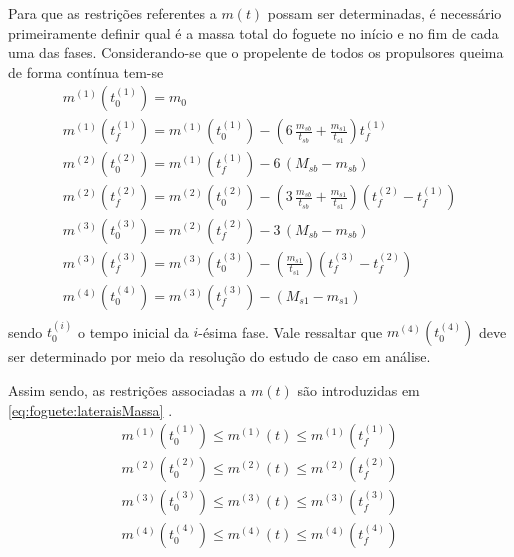 Para que as restrições referentes a $ m(t) $ possam ser determinadas, é necessário primeiramente definir qual é a massa total do foguete no início e no fim de cada uma das fases. Considerando-se que o propelente de todos os propulsores queima de forma contínua tem-se
%
\begin{equation}
\begin{gathered}
m^{(1)} \left( t_0^{(1)} \right) = m_0 \\
m^{(1)} \left( t_f^{(1)} \right) = m^{(1)} \left( t_0^{(1)} \right) - \left( 6 \, \frac{m_{sb}}{t_{sb}} + \frac{m_{s1}}{t_{s1}} \right) t_f^{(1)} \\
m^{(2)} \left( t_0^{(2)} \right) = m^{(1)} \left( t_f^{(1)} \right) - 6 \, (M_{sb} - m_{sb}) \\
m^{(2)} \left( t_f^{(2)} \right) = m^{(2)} \left( t_0^{(2)} \right) - \left( 3 \, \frac{m_{sb}}{t_{sb}} + \frac{m_{s1}}{t_{s1}} \right) \left( t_f^{(2)} - t_f^{(1)} \right) \\
m^{(3)} \left( t_0^{(3)} \right) = m^{(2)} \left( t_f^{(2)} \right) - 3 \, (M_{sb} - m_{sb}) \\
m^{(3)} \left( t_f^{(3)} \right) = m^{(3)} \left( t_0^{(3)} \right) - \left( \frac{m_{s1}}{t_{s1}} \right) \left( t_f^{(3)} - t_f^{(2)} \right) \\
m^{(4)} \left( t_0^{(4)} \right) = m^{(3)} \left( t_f^{(3)} \right) - ( M_{s1} - m_{s1} ) \\
\end{gathered}
\end{equation}
%
sendo $ t_0^{(i)} $ o tempo inicial da $ i $-ésima fase. Vale ressaltar que $ m^{(4)} \left( t_0^{(4)} \right) $ deve ser determinado por meio da resolução do estudo de caso em análise. 

Assim sendo, as restrições associadas a $ m(t) $ são introduzidas em \eqref{eq:foguete:lateraisMassa} \cite{becerra_psopt_2019}.
%
\begin{equation}
	\label{eq:foguete:lateraisMassa}
	\begin{gathered}
		m^{(1)} \left( t_0^{(1)} \right) \leq m^{(1)}(t) \leq m^{(1)} \left( t_f^{(1)} \right) \\
		m^{(2)} \left( t_0^{(2)} \right) \leq m^{(2)}(t) \leq m^{(2)} \left( t_f^{(2)} \right) \\
		m^{(3)} \left( t_0^{(3)} \right) \leq m^{(3)}(t) \leq m^{(3)} \left( t_f^{(3)} \right) \\
		m^{(4)} \left( t_0^{(4)} \right) \leq m^{(4)}(t) \leq m^{(4)} \left( t_f^{(4)} \right) \\
	\end{gathered}
\end{equation}

